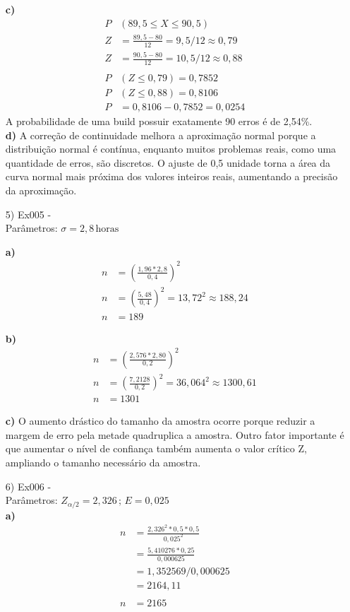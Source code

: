 \documentclass[fleqn, 12pt]{article}
\begin{document}
\begin{itemize}
\textbf{c)}
\begin{align*}
    P&(89,5 \leq X \leq 90,5)\\
    Z&=\frac{89,5 - 80}{12}=9,5/12\approx0,79\\
    Z&=\frac{90,5 - 80}{12}=10,5/12\approx0,88\\\\
    P&(Z\leq 0,79) = 0,7852\\
    P&(Z\leq 0,88) =0,8106\\
    P &= 0,8106 - 0,7852 = 0,0254
\end{align*}
A probabilidade de uma build possuir exatamente 90 erros é de 2,54\%.\\

\textbf{d)}
A correção de continuidade melhora a aproximação normal porque a distribuição normal é contínua, enquanto muitos problemas reais, como uma quantidade de erros, são discretos. O ajuste de 0,5 unidade torna a área da curva normal mais próxima dos valores inteiros reais, aumentando a precisão da aproximação.

\item[5)] Ex005 -\\Parâmetros: $\sigma = 2,8\,\text{horas}$

\textbf{a)}
\begin{align*}
    n&=\left (\frac{1,96 * 2,8}{0,4} \right)^2\\
    n&=\left (\frac{5,48}{0,4} \right)^2 = 13,72^2 \approx 188,24\\
    n&=189
\end{align*}

\textbf{b)}
\begin{align*}
    n&=\left (\frac{2,576 * 2,80}{0,2} \right)^2\\
    n&=\left (\frac{7,2128}{0,2} \right)^2 = 36,064^2 \approx 1300,61\\
    n&=1301
\end{align*}

\textbf{c)}
O aumento drástico do tamanho da amostra ocorre porque reduzir a margem de erro pela metade quadruplica a amostra. Outro fator importante é que aumentar o nível de confiança também aumenta o valor crítico Z, ampliando o tamanho necessário da amostra.\newpage

\item[6)] Ex006 -\\Parâmetros: $Z_{\alpha/2} = 2,326\,;\,E =0,025$\\

\textbf{a)}
\begin{align*}
    n&=\frac{2,326^2 * 0,5 * 0,5}{0,025^2}\\
    &=\frac{5,410276*0,25}{0,000625}\\
    &=1,352569/0,000625\\
    &=2164,11\\\\
    n&=2165
\end{align*}


\end{itemize}
\end{document}
